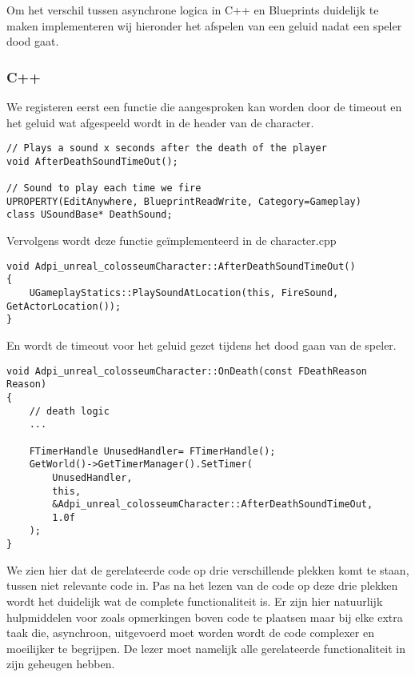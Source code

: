 Om het verschil tussen asynchrone logica in C++ en Blueprints duidelijk te maken implementeren wij hieronder het afspelen van een geluid nadat een speler dood gaat.

\subsubsection{C++}
We registeren eerst een functie die aangesproken kan worden door de timeout en het geluid wat afgespeeld wordt in de header van de character.

\begin{lstlisting}[caption=Registratie van de timeout functie en het geluid]	
// Plays a sound x seconds after the death of the player
void AfterDeathSoundTimeOut();

// Sound to play each time we fire
UPROPERTY(EditAnywhere, BlueprintReadWrite, Category=Gameplay)
class USoundBase* DeathSound;
\end{lstlisting}

Vervolgens wordt deze functie geïmplementeerd in de character.cpp

\begin{lstlisting}[caption=Registratie van de timeout functie en het geluid]
void Adpi_unreal_colosseumCharacter::AfterDeathSoundTimeOut() 
{
	UGameplayStatics::PlaySoundAtLocation(this, FireSound, GetActorLocation());
}
\end{lstlisting}

En wordt de timeout voor het geluid gezet tijdens het dood gaan van de speler.

\begin{lstlisting}[caption=Implementatie van de OnDeath functie]
void Adpi_unreal_colosseumCharacter::OnDeath(const FDeathReason Reason)
{
	// death logic
	...

	FTimerHandle UnusedHandler= FTimerHandle();
	GetWorld()->GetTimerManager().SetTimer(
		UnusedHandler, 
		this, 
		&Adpi_unreal_colosseumCharacter::AfterDeathSoundTimeOut, 
		1.0f
	);
}
\end{lstlisting}

We zien hier dat de gerelateerde code op drie verschillende plekken komt te staan, tussen niet relevante code in. Pas na het lezen van de code op deze drie plekken wordt het duidelijk wat de complete functionaliteit is. Er zijn hier natuurlijk hulpmiddelen voor zoals opmerkingen boven code te plaatsen maar bij elke extra taak die, asynchroon, uitgevoerd moet worden wordt de code complexer en moeilijker te begrijpen. De lezer moet namelijk alle gerelateerde functionaliteit in zijn geheugen hebben.

